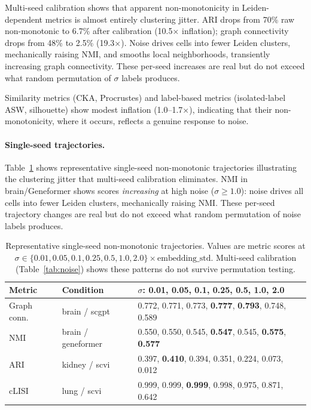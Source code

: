 \documentclass[11pt]{article}
\begin{document}
Multi-seed calibration shows that apparent non-monotonicity in
Leiden-dependent metrics is almost entirely clustering jitter. ARI
drops from 70\% raw non-monotonic to 6.7\% after calibration
(10.5$\times$ inflation); graph connectivity drops from 48\% to 2.5\%
(19.3$\times$). Noise drives cells into fewer Leiden clusters,
mechanically raising NMI, and smooths local neighborhoods, transiently
increasing graph connectivity. These per-seed increases are real but
do not exceed what random permutation of $\sigma$ labels produces.

Similarity metrics (CKA, Procrustes) and label-based metrics
(isolated-label ASW, silhouette) show modest inflation
(1.0--1.7$\times$), indicating that their non-monotonicity, where it
occurs, reflects a genuine response to noise.

\paragraph{Single-seed trajectories.}
Table~\ref{tab:app_noise_fail} shows representative single-seed
non-monotonic trajectories illustrating the clustering jitter that
multi-seed calibration eliminates. NMI in brain/Geneformer shows scores
\emph{increasing} at high noise ($\sigma \geq 1.0$): noise drives all
cells into fewer Leiden clusters, mechanically raising NMI. These
per-seed trajectory changes are real but do not exceed what random
permutation of noise labels produces.

\begin{table}[h!]
\centering
\caption{Representative single-seed non-monotonic trajectories. Values
are metric scores at $\sigma \in \{0.01, 0.05, 0.1, 0.25, 0.5, 1.0,
2.0\} \times \text{embedding\_std}$. Multi-seed calibration
(Table~\ref{tab:noise}) shows these patterns do not survive permutation
testing.}
\label{tab:app_noise_fail}
\footnotesize
\begin{tabular}{@{}llp{}@{}}
\toprule
Metric & Condition & $\sigma$: 0.01, 0.05, 0.1, 0.25, 0.5, 1.0, 2.0 \\
\midrule
Graph conn. & brain / scgpt & 0.772, 0.771, 0.773, \textbf{0.777}, \textbf{0.793}, 0.748, 0.589 \\
NMI & brain / geneformer & 0.550, 0.550, 0.545, \textbf{0.547}, 0.545, \textbf{0.575}, \textbf{0.577} \\
ARI & kidney / scvi & 0.397, \textbf{0.410}, 0.394, 0.351, 0.224, 0.073, 0.012 \\
cLISI & lung / scvi & 0.999, 0.999, \textbf{0.999}, 0.998, 0.975, 0.871, 0.642 \\
\bottomrule
\end{tabular}
\end{table}






\end{document}

